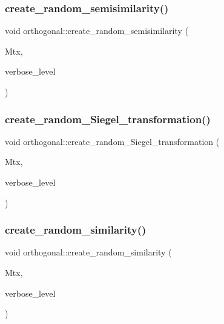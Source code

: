 \subsubsection{\texorpdfstring{create\+\_\+random\+\_\+semisimilarity()}{create\_random\_semisimilarity()}}
{\footnotesize\ttfamily void orthogonal\+::create\+\_\+random\+\_\+semisimilarity (\begin{DoxyParamCaption}\item[{\mbox{\hyperlink{galois_8h_a09fddde158a3a20bd2dcadb609de11dc}{I\+NT}} $\ast$}]{Mtx,  }\item[{\mbox{\hyperlink{galois_8h_a09fddde158a3a20bd2dcadb609de11dc}{I\+NT}}}]{verbose\+\_\+level }\end{DoxyParamCaption})}

\mbox{\label{classorthogonal_ad691ec706194282d2954a5edaca883cf}} 
\subsubsection{\texorpdfstring{create\+\_\+random\+\_\+\+Siegel\+\_\+transformation()}{create\_random\_Siegel\_transformation()}}
{\footnotesize\ttfamily void orthogonal\+::create\+\_\+random\+\_\+\+Siegel\+\_\+transformation (\begin{DoxyParamCaption}\item[{\mbox{\hyperlink{galois_8h_a09fddde158a3a20bd2dcadb609de11dc}{I\+NT}} $\ast$}]{Mtx,  }\item[{\mbox{\hyperlink{galois_8h_a09fddde158a3a20bd2dcadb609de11dc}{I\+NT}}}]{verbose\+\_\+level }\end{DoxyParamCaption})}

\mbox{\label{classorthogonal_ac07aa53e01eb4a42d182464440a3f8b0}} 
\subsubsection{\texorpdfstring{create\+\_\+random\+\_\+similarity()}{create\_random\_similarity()}}
{\footnotesize\ttfamily void orthogonal\+::create\+\_\+random\+\_\+similarity (\begin{DoxyParamCaption}\item[{\mbox{\hyperlink{galois_8h_a09fddde158a3a20bd2dcadb609de11dc}{I\+NT}} $\ast$}]{Mtx,  }\item[{\mbox{\hyperlink{galois_8h_a09fddde158a3a20bd2dcadb609de11dc}{I\+NT}}}]{verbose\+\_\+level }\end{DoxyParamCaption})}

